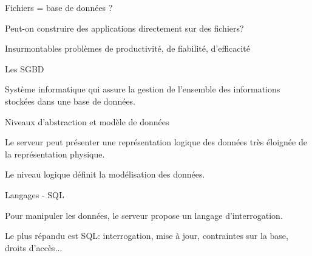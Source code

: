 \begin{frame}{Fichiers = base de données ? }

Peut-on construire des applications directement sur des fichiers?
\vfill


\vfill

Insurmontables problèmes de productivité, de fiabilité, d'efficacité
\end{frame}



\begin{frame}{Les SGBD }

Système informatique qui assure la gestion de l'ensemble des informations
stockées dans une base de données.


\vfill


\end{frame}


\begin{frame}{Niveaux d'abstraction et modèle de données}

Le serveur peut présenter une représentation \alert{logique} des données très éloignée
de la représentation \alert{physique}.

\vfill


\vfill

Le niveau logique définit la \alert{modélisation} des données.


\end{frame}


\begin{frame}{Langages - SQL}

Pour manipuler les données, le serveur propose un \alert{langage d'interrogation}.

\vfill

Le plus répandu est SQL: interrogation, mise à jour, contraintes sur la base, droits d'accès...

\vfill


\end{frame}



